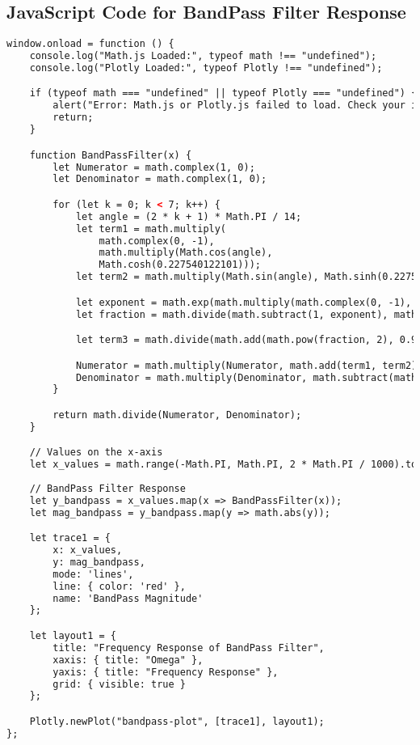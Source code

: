 \documentclass{article}
\begin{document}
\subsection{JavaScript Code for BandPass Filter Response}
\begin{lstlisting}[language=HTML, caption=Filter Type Definition]
window.onload = function () {
    console.log("Math.js Loaded:", typeof math !== "undefined");
    console.log("Plotly Loaded:", typeof Plotly !== "undefined");

    if (typeof math === "undefined" || typeof Plotly === "undefined") {
        alert("Error: Math.js or Plotly.js failed to load. Check your internet connection.");
        return;
    }

    function BandPassFilter(x) {
        let Numerator = math.complex(1, 0);
        let Denominator = math.complex(1, 0);

        for (let k = 0; k < 7; k++) {
            let angle = (2 * k + 1) * Math.PI / 14;
            let term1 = math.multiply(
                math.complex(0, -1), 
                math.multiply(Math.cos(angle), 
                Math.cosh(0.227540122101)));
            let term2 = math.multiply(Math.sin(angle), Math.sinh(0.227540122101));

            let exponent = math.exp(math.multiply(math.complex(0, -1), x));
            let fraction = math.divide(math.subtract(1, exponent), math.add(1, exponent));

            let term3 = math.divide(math.add(math.pow(fraction, 2), 0.918), math.multiply(1.59, fraction));

            Numerator = math.multiply(Numerator, math.add(term1, term2));
            Denominator = math.multiply(Denominator, math.subtract(math.subtract(term3, term1), term2));
        }

        return math.divide(Numerator, Denominator);
    }

    // Values on the x-axis
    let x_values = math.range(-Math.PI, Math.PI, 2 * Math.PI / 1000).toArray();
    
    // BandPass Filter Response
    let y_bandpass = x_values.map(x => BandPassFilter(x));
    let mag_bandpass = y_bandpass.map(y => math.abs(y));

    let trace1 = {
        x: x_values,
        y: mag_bandpass,
        mode: 'lines',
        line: { color: 'red' },
        name: 'BandPass Magnitude'
    };

    let layout1 = {
        title: "Frequency Response of BandPass Filter",
        xaxis: { title: "Omega" },
        yaxis: { title: "Frequency Response" },
        grid: { visible: true }
    };

    Plotly.newPlot("bandpass-plot", [trace1], layout1);
};
\end{lstlisting}
\end{document}

